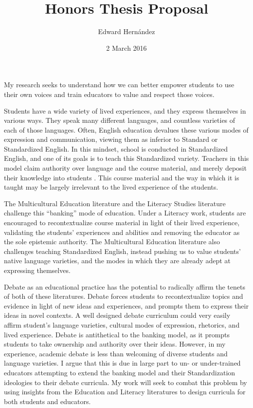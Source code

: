 \documentclass[man,12pt,natbib]{apa6}
\begin{document}
\title{Honors Thesis Proposal}
\author{Edward Hern\'{a}ndez}
\date{2 March 2016}
\maketitle

My research seeks to understand how we can better empower students to use their
own voices and train educators to value and respect those voices.

Students have a wide variety of lived experiences, and they express themselves
in various ways. They speak many different languages, and countless varieties
of each of those languages. Often, English education devalues these various
modes of expression and communication, viewing them as inferior to Standard or
Standardized English. In this mindset, school is conducted in Standardized
English, and one of its goals is to teach this Standardized variety. Teachers
in this model claim authority over language \citep{LippiGreen11} and the course
material, and merely deposit their knowledge into students \citep{Friere68}.
This course material and the way in which it is taught may be largely
irrelevant to the lived experience of the students.

The Multicultural Education literature and the Literacy Studies literature
challenge this ``banking'' mode of education. Under a Literacy work, students
are encouraged to recontextualize course material in light of their lived
experience, validating the students' experiences and abilities and removing the
educator as the sole epistemic authority. The Multicultural Education
literature also challenges teaching Standardized English, instead pushing us to
value students' native language varieties, and the modes in which they are
already adept at expressing themselves.

Debate as an educational practice has the potential to radically affirm the
tenets of both of these literatures. Debate forces students to recontextualize
topics and evidence in light of new ideas and experiences, and prompts them to
express their ideas in novel contexts. A well designed debate curriculum could
very easily affirm student's language varieties, cultural modes of expression,
rhetorics, and lived experience. Debate is antithetical to the banking model,
as it prompts students to take ownership and authority over their ideas.
However, in my experience, academic debate is less than welcoming of diverse
students and language varieties. I argue that this is due in large part to
un- or under-trained educators attempting to extend the banking model and 
their Standardization ideologies to their debate curricula. My work will seek
to combat this problem by using insights from the Education and Literacy
literatures to design curricula for both students and educators.
\end{document}
